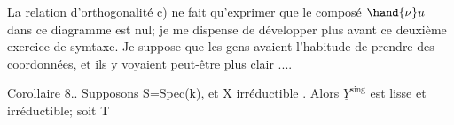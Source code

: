 La relation d'orthogonalité c) ne fait qu'exprimer que le composé
$\hand{\nu}u$ dans ce diagramme est nul; je me dispense de développer plus
avant ce deuxième exercice de symtaxe. Je suppose que les gens avaient
l'habitude de prendre des coordonnées, et ils y voyaient peut-être plus
clair ....

\uline{Corollaire} 8.. Supposons S=Spec(k),   et X
irréductible .  Alors $\underline{Y}^{\mathrm{sing}}$ est lisse et irréductible; soit T

